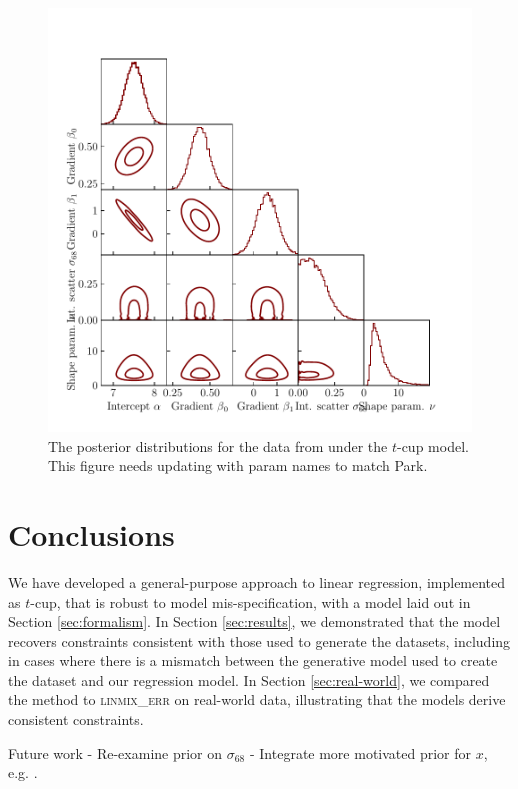 \documentclass[fleqn,usenatbib]{rasti}
\begin{document}
\begin{figure}
    \includegraphics[width=\columnwidth]{graphics/real/corner_park_fwhm.pdf}
    \caption{The posterior distributions for the data from \citet{Park:2017}
    under the $t$-cup model. {\color{red} This figure
    needs updating with param names to match Park.}}
    \label{fig:real-world.park.corner}
\end{figure}

\section{Conclusions}
\label{sec:conclusion}

We have developed a general-purpose approach to linear regression, implemented as $t$-cup, that
is robust to model mis-specification, with a model laid out in Section
\ref{sec:formalism}. In Section \ref{sec:results}, we demonstrated that the
model recovers constraints consistent with those used to generate the datasets,
including in cases where there is a mismatch between the generative model used
to create the dataset and our regression model. In Section \ref{sec:real-world},
we compared the method to \textsc{linmix\_err} \citep{Kelly:2007} on real-world
data, illustrating that the models derive consistent constraints.

Future work
- Re-examine prior on $\sigma_{68}$
- Integrate more motivated prior for $x$, e.g. \citet{Bartlett:2023}.
\end{document}
